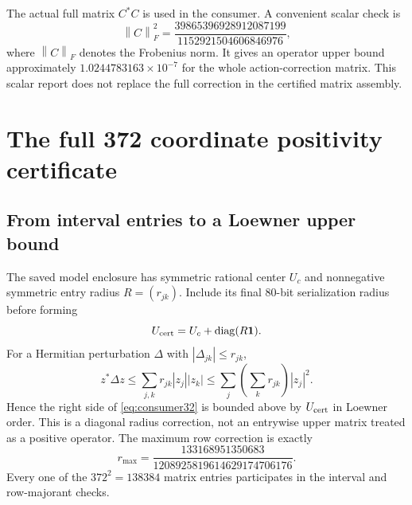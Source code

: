 \documentclass[11pt,a4paper]{article}
\numberwithin{equation}{section}
\theoremstyle{definition}\newtheorem{definition}[theorem]{Definition}
\theoremstyle{remark}\newtheorem{remark}[theorem]{Remark}
\newcommand{\norm}[1]{\left\|#1\right\|}
\newcommand{\diag}{\operatorname{diag}}
\begin{document}
The actual full matrix $C^*C$ is used in the consumer. A convenient scalar check is
\begin{equation}\label{eq:Cnorm64}
 \norm C_F^2=\frac{39865396928912087199}{1152921504606846976},
\end{equation}
where $\norm C_F$ denotes the Frobenius norm. It gives an operator upper bound approximately $1.0244783163\times10^{-7}$ for the whole action-correction matrix. This scalar report does not replace the full correction in the certified matrix assembly.

\section{The full 372 coordinate positivity certificate}\label{sec:full32}
\subsection{From interval entries to a Loewner upper bound}
The saved model enclosure has symmetric rational center $U_c$ and nonnegative symmetric entry radius $R=(r_{jk})$. Include its final 80-bit serialization radius before forming
\begin{equation}\label{eq:Ucert32}
 U_{\rm cert}=U_c+\diag(R\mathbf1).
\end{equation}
For a Hermitian perturbation $\Delta$ with $|\Delta_{jk}|\le r_{jk}$,
\[
 z^*\Delta z\le\sum_{j,k}r_{jk}|z_j||z_k|
 \le\sum_j\left(\sum_kr_{jk}\right)|z_j|^2.
\]
Hence the right side of \eqref{eq:consumer32} is bounded above by $U_{\rm cert}$ in Loewner order. This is a diagonal radius correction, not an entrywise upper matrix treated as a positive operator. The maximum row correction is exactly
\begin{equation}\label{eq:row32}
 r_{\max}=\frac{133168951350683}{1208925819614629174706176}.
\end{equation}
Every one of the $372^2=138384$ matrix entries participates in the interval and row-majorant checks.
\end{document}
